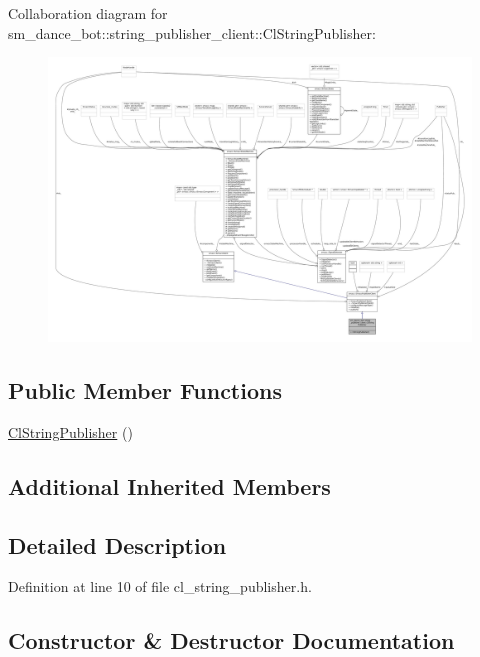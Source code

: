 Collaboration diagram for sm\+\_\+dance\+\_\+bot\+:\+:string\+\_\+publisher\+\_\+client\+:\+:Cl\+String\+Publisher\+:
\nopagebreak
\begin{figure}[H]
\begin{center}
\leavevmode
\includegraphics[width=350pt]{classsm__dance__bot_1_1string__publisher__client_1_1ClStringPublisher__coll__graph}
\end{center}
\end{figure}
\subsection*{Public Member Functions}
\begin{DoxyCompactItemize}
\item 
\hyperlink{classsm__dance__bot_1_1string__publisher__client_1_1ClStringPublisher_a9ddc258883d59c6333363501da9a1641}{Cl\+String\+Publisher} ()
\end{DoxyCompactItemize}
\subsection*{Additional Inherited Members}


\subsection{Detailed Description}


Definition at line 10 of file cl\+\_\+string\+\_\+publisher.\+h.



\subsection{Constructor \& Destructor Documentation}
